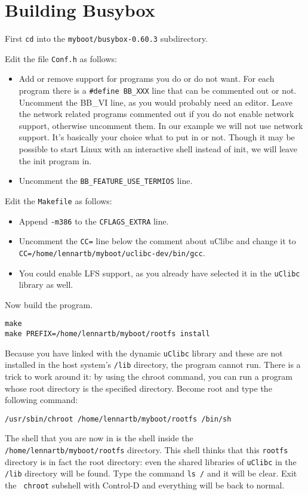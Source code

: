 \documentclass[12pt,a4paper]{article}
\begin{document}
\section{Building Busybox}

First {\tt cd} into the {\tt myboot/busybox-0.60.3} subdirectory. 


Edit the file {\tt Conf.h} as follows:
\begin{itemize}
\item Add or remove support for programs you do or do not want. For
  each program there is a {\tt \#define BB\_XXX} line that can be
  commented out or not. Uncomment the BB\_VI line, as you would
  probably need an editor. Leave the network related programs
  commented out if you do not enable network support, otherwise
  uncomment them. In our example we will not use network support. It's
  basically your choice what to put in or not. Though it may be
  possible to start Linux with an interactive shell instead of init,
  we will leave the init program in.
\item Uncomment the {\tt BB\_FEATURE\_USE\_TERMIOS} line.
\end{itemize}

Edit the {\tt Makefile} as follows:
\begin{itemize}
\item Append {\tt -m386} to the {\tt CFLAGS\_EXTRA} line.
\item Uncomment the {\tt CC=} line below the comment about uClibc and
  change it to {\tt CC=/home/lennartb/myboot/uclibc-dev/bin/gcc}. 
\item You could enable LFS support, as you already have selected it in
  the {\tt uClibc} library as well.
\end{itemize}

Now build the program.
\begin{verbatim}
make
make PREFIX=/home/lennartb/myboot/rootfs install
\end{verbatim}

Because you have linked with the dynamic {\tt uClibc} library and
these are not installed in the host system's {\tt /lib} directory,
the program cannot run. There is a trick to work around it: by using
the chroot command, you can run a program whose root directory is the
specified directory. Become root and type the following command:
\begin{verbatim}
/usr/sbin/chroot /home/lennartb/myboot/rootfs /bin/sh
\end{verbatim}
The shell that you are now in is the shell inside the\\
{\tt /home/lennartb/myboot/rootfs} directory. This shell thinks that
this {\tt rootfs} directory is in fact the root directory: even the
shared libraries of {\tt uClibc} in the {\tt /lib} directory will be
found. Type the command {\tt ls /} and it will be clear. Exit the {\tt
  chroot} subshell with Control-D and everything will be back to normal.
\end{document}
